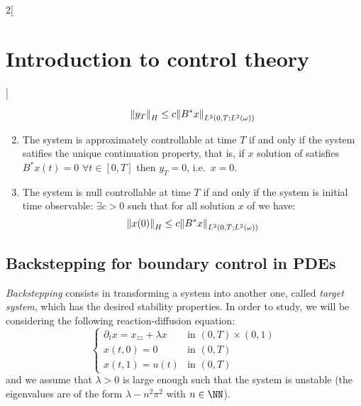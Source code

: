 \documentclass[../../../main_math.tex]{subfiles}
\begin{document}
\begin{multicols}{2}[\section{Introduction to control theory}]
\begin{theorem}
\begin{enumerate}
            $$
              \norm{y_T}_{H}\leq c\norm{B^*x}_{L^2(0,T;L^2(\omega))}
            $$
      \item The system  is approximately controllable at time $T$ if and only if the system  satifies the unique continuation property, that is, if $x$ solution of  satisfies $B^*x(t)=0$ $\forall t\in [0,T]$ then $y_T=0$, i.e.\ $x=0$.
      \item The system  is null controllable at time $T$ if and only if the system  is initial time observable: $\exists c>0$ such that for all solution $x$ of  we have:
            $$
              \norm{x(0)}_{H}\leq c\norm{B^*x}_{L^2(0,T;L^2(\omega))}
            $$
    \end{enumerate}
  \end{theorem}
  \subsection{Backstepping for boundary control in PDEs}
  \emph{Backstepping} consists in transforming a system into another one, called \emph{target system}, which has the desired stability properties. In order to study, we will be considering the following reaction-diffusion equation:
  \begin{equation}\label{ICT:reaction_diffusion}
    \begin{cases}
      \partial_t x=x_{zz}+\lambda x & \text{in } (0,T)\times (0,1) \\
      x(t,0)=0                      & \text{in } (0,T)             \\
      x(t,1)=u(t)                   & \text{in } (0,T)
    \end{cases}
  \end{equation}
  and we assume that $\lambda>0$ is large enough such that the system is unstable (the eigenvalues are of the form $\lambda-n^2\pi^2$ with $n\in\NN$).


\end{multicols}
\end{document}
